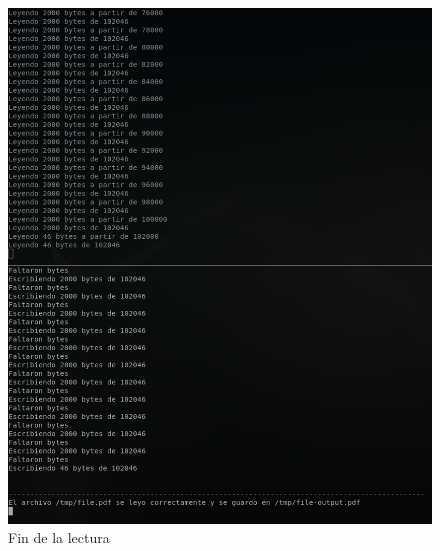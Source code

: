 \documentclass[12pt,journal,compsoc]{IEEEtran}
\begin{document}
\begin{figure}[H]
  \centering
  \includegraphics[width=160mm]{images/punto-3/read/3-end-read.png}
  \caption{Fin de la lectura}
  \label{fig:end-read}
\end{figure}
\end{document}
